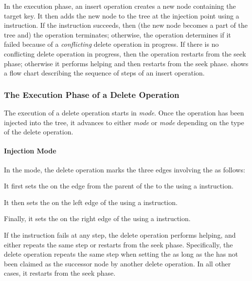\begin{limitscope}

In the execution phase, an insert operation creates a new node containing the target key. It then adds the new node to the tree at the injection point using a \CAS{} instruction. If the \CAS{} instruction succeeds, then (the new node becomes a part of the tree and) the operation terminates; otherwise, the operation determines if it failed because of a \emph{conflicting} delete operation in progress. If there is no conflicting delete operation in progress, then the operation restarts from the seek phase; otherwise it performs helping and then restarts from the seek phase.  shows a  flow chart describing the sequence of steps of an insert operation.

\subsubsection{The Execution Phase of a Delete Operation}
The execution of a delete operation starts in \emph{\injection{} mode}. Once the operation has been injected into the tree, it advances to either \emph{\discovery{} mode} or \emph{\cleanup{} mode} depending on the type of the delete operation.


\paragraph*{Injection Mode}

In the \injection{} mode, the delete operation marks the three edges involving the \targetnode{} as follows:
\begin{enumerate*}[label=(\roman*)]
\item It first sets the \intentFlag{} on the edge from the parent of the \targetnode{} to the \targetnode{} using a \CAS{} instruction.
\item It then sets the \deleteFlag{} on the left edge of the \targetnode{} using a \CAS{} instruction.
\item Finally, it sets the \deleteFlag{} on the right edge of the \targetnode{} using a \CAS{} instruction.
\end{enumerate*}
If the \CAS{} instruction fails at any step, the delete operation performs helping, and either repeats the same step or restarts from the seek phase. Specifically, the delete operation repeats the same step when setting the \deleteFlag{} as long as the \targetnode{} has not been claimed as the successor node by another delete operation. In all other cases, it restarts from the seek phase.



\end{limitscope}
